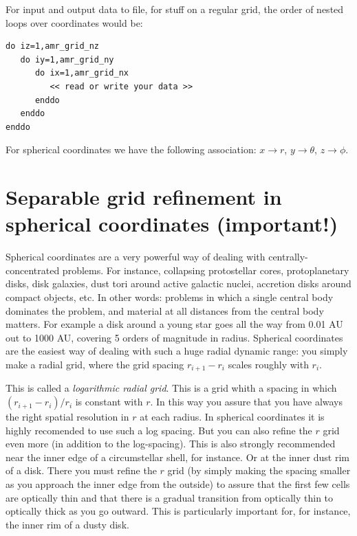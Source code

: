 \documentclass{report}
\newenvironment{asciibox}%
  {\begin{list}{}{%
    \setlength{\topsep}{0.5em}%
    \setlength{\parskip}{0em}%
    \setlength{\parsep}{0em}%
    \setlength{\itemsep}{0em}%
    \setlength{\rightmargin}{0em}%
    \setlength{\leftmargin}{3.0em}%
    \setlength{\labelsep}{1em}%
    \setlength{\labelwidth}{2em}%
  }\normalfont\footnotesize\item}
  {\end{list}}
\begin{document}
For input and output data to file, for stuff on a regular grid, the order of
nested loops over coordinates would be:
\begin{asciibox}\begin{verbatim}
do iz=1,amr_grid_nz
   do iy=1,amr_grid_ny
      do ix=1,amr_grid_nx
         << read or write your data >>
      enddo
   enddo
enddo
\end{verbatim}\end{asciibox}

For spherical coordinates we have the following association: $x\rightarrow r$,
$y\rightarrow \theta$, $z\rightarrow \phi$.




\section{Separable grid refinement in spherical coordinates (important!)}
\label{sec-separable-refinement}
%
Spherical coordinates are a very powerful way of dealing with
centrally-concentrated problems. For instance, collapsing protostellar
cores, protoplanetary disks, disk galaxies, dust tori around active galactic
nuclei, accretion disks around compact objects, etc. In other words:
problems in which a single central body dominates the problem, and material
at all distances from the central body matters. For example a disk around
a young star goes all the way from 0.01 AU out to 1000 AU, covering 5
orders of magnitude in radius. Spherical coordinates are the easiest way 
of dealing with such a huge radial dynamic range: you simply make a radial
grid, where the grid spacing $r_{i+1}-r_i$ scales roughly with $r_i$. 

This is called a {\em logarithmic radial grid}. This is a grid whith a
spacing in which $(r_{i+1}-r_i)/r_i$ is constant with $r$. In this way you
assure that you have always the right spatial resolution in $r$ at each
radius. In spherical coordinates it is highly recomended to use such a log
spacing. But you can also refine the $r$ grid even more (in addition to the
log-spacing). This is also strongly recommended near the inner edge of a
circumstellar shell, for instance.  Or at the inner dust rim of a
disk. There you must refine the $r$ grid (by simply making the spacing
smaller as you approach the inner edge from the outside) to assure that the
first few cells are optically thin and that there is a gradual transition
from optically thin to optically thick as you go outward. This is
particularly important for, for instance, the inner rim of a dusty disk.
\end{document}
